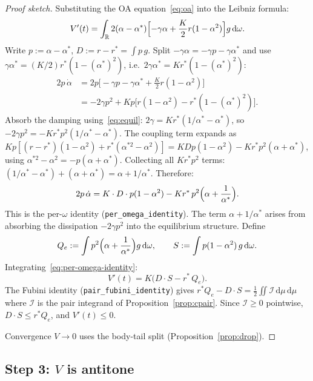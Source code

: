 \documentclass[11pt,a4paper]{article}
\theoremstyle{definition}
\newcommand{\R}{\mathbb{R}}
\begin{document}
\begin{proof}[Proof sketch]
Substituting the OA equation~\eqref{eq:oa} into the Leibniz formula:
\[
V'(t) = \int_\R 2(\alpha - \alpha^*)\Bigl[-\gamma\alpha + \frac{K}{2}r(1-\alpha^2)\Bigr] g\,\mathrm{d}\omega.
\]
Write $p := \alpha - \alpha^*$, $D := r - r^* = \int p\,g$. Split $-\gamma\alpha = -\gamma p - \gamma\alpha^*$ and use $\gamma\alpha^* = (K/2)r^*(1-(\alpha^*)^2)$, i.e.\ $2\gamma\alpha^* = Kr^*(1-(\alpha^*)^2)$:
\begin{align*}
2p\,\dot\alpha
&= 2p\bigl[-\gamma p - \gamma\alpha^* + \tfrac{K}{2}r(1-\alpha^2)\bigr] \\
&= -2\gamma p^2 + Kp\bigl[r(1-\alpha^2) - r^*(1-(\alpha^*)^2)\bigr].
\end{align*}
Absorb the damping using~\eqref{eq:equil}: $2\gamma = Kr^*(1/\alpha^* - \alpha^*)$, so $-2\gamma p^2 = -Kr^*p^2(1/\alpha^* - \alpha^*)$. The coupling term expands as $Kp[(r-r^*)(1-\alpha^2) + r^*(\alpha^{*2}-\alpha^2)] = K D p(1-\alpha^2) - Kr^*p^2(\alpha+\alpha^*)$, using $\alpha^{*2}-\alpha^2 = -p(\alpha+\alpha^*)$. Collecting all $Kr^*p^2$ terms: $(1/\alpha^* - \alpha^*) + (\alpha+\alpha^*) = \alpha + 1/\alpha^*$. Therefore:
\begin{equation}\label{eq:per-omega-identity}
2p\,\dot\alpha = K\cdot D\cdot p(1-\alpha^2) - Kr^*\,p^2\Bigl(\alpha + \frac{1}{\alpha^*}\Bigr).
\end{equation}
This is the per-$\omega$ identity (\texttt{per\_omega\_identity}). The term $\alpha + 1/\alpha^*$ arises from absorbing the dissipation $-2\gamma p^2$ into the equilibrium structure. Define
\[
Q_e := \int p^2\Bigl(\alpha + \frac{1}{\alpha^*}\Bigr)g\,\mathrm{d}\omega, \qquad
S := \int p(1-\alpha^2)\,g\,\mathrm{d}\omega.
\]
Integrating~\eqref{eq:per-omega-identity}:
\begin{equation}\label{eq:Vprime-QeDS}
V'(t) = K\bigl(D\cdot S - r^*\,Q_e\bigr).
\end{equation}
The Fubini identity (\texttt{pair\_fubini\_identity}) gives $r^*Q_e - D\cdot S = \frac{1}{2}\iint \mathcal{I}\,\mathrm{d}\mu\,\mathrm{d}\mu$ where $\mathcal{I}$ is the pair integrand of Proposition~\ref{prop:cpair}. Since $\mathcal{I} \geq 0$ pointwise, $D\cdot S \leq r^*Q_e$, and $V'(t) \leq 0$.

Convergence $V \to 0$ uses the body-tail split (Proposition~\ref{prop:drop}).
\end{proof}

\subsection{Step 3: $V$ is antitone}\label{sec:antitone}
\end{document}
